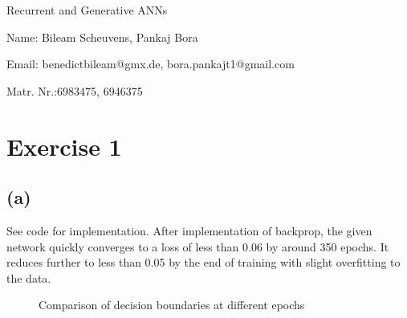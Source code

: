 \documentclass[11pt]{article}
\numberwithin{equation}{section}
\begin{document}
\begin{center}
    \sc Recurrent and Generative ANNs
\end{center}

\noindent Name: Bileam Scheuvens, Pankaj Bora

\noindent Email: benedictbileam@gmx.de, bora.pankajt1@gmail.com

\noindent Matr. Nr.:6983475, 6946375



\section*{Exercise 1}
\subsection*{(a)}
See code for implementation.
\newline
After implementation of backprop, the given network quickly converges to a loss of less than 0.06 by around 350 epochs. It reduces further to less than 0.05 by the end of training with slight overfitting to the data. 


\begin{figure}[H]
  \centering
  \hspace{0.05\textwidth} %
  \caption{Comparison of decision boundaries at different epochs}
  \label{fig:decision_boundaries}


\end{figure}
\end{document}
